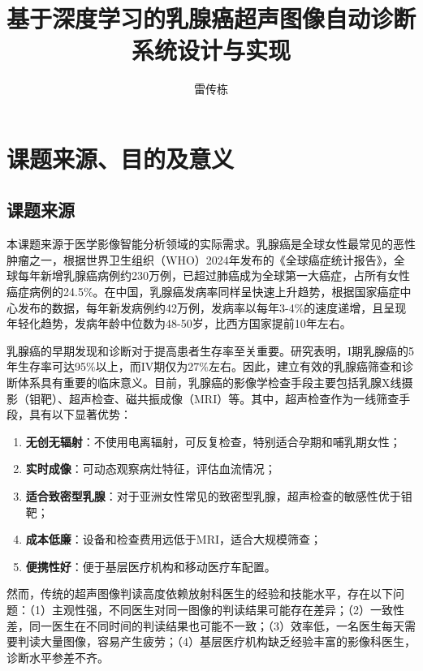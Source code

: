 \documentclass[supercite]{Hust-undergraduate-kaiti}
\title{基于深度学习的乳腺癌超声图像自动诊断系统设计与实现}
\author{雷传栋}
\theoremstyle{definition}
\begin{document}
\maketitle
\clearpage


\section{课题来源、目的及意义}

\subsection{课题来源}

本课题来源于医学影像智能分析领域的实际需求。乳腺癌是全球女性最常见的恶性肿瘤之一，根据世界卫生组织（WHO）2024年发布的《全球癌症统计报告》，全球每年新增乳腺癌病例约230万例，已超过肺癌成为全球第一大癌症，占所有女性癌症病例的24.5\%。在中国，乳腺癌发病率同样呈快速上升趋势，根据国家癌症中心发布的数据，每年新发病例约42万例，发病率以每年3-4\%的速度递增，且呈现年轻化趋势，发病年龄中位数为48-50岁，比西方国家提前10年左右。

乳腺癌的早期发现和诊断对于提高患者生存率至关重要。研究表明，I期乳腺癌的5年生存率可达95\%以上，而IV期仅为27\%左右。因此，建立有效的乳腺癌筛查和诊断体系具有重要的临床意义。目前，乳腺癌的影像学检查手段主要包括乳腺X线摄影（钼靶）、超声检查、磁共振成像（MRI）等。其中，超声检查作为一线筛查手段，具有以下显著优势：

\begin{enumerate}
    \item \textbf{无创无辐射}：不使用电离辐射，可反复检查，特别适合孕期和哺乳期女性；
    \item \textbf{实时成像}：可动态观察病灶特征，评估血流情况；
    \item \textbf{适合致密型乳腺}：对于亚洲女性常见的致密型乳腺，超声检查的敏感性优于钼靶；
    \item \textbf{成本低廉}：设备和检查费用远低于MRI，适合大规模筛查；
    \item \textbf{便携性好}：便于基层医疗机构和移动医疗车配置。
\end{enumerate}

然而，传统的超声图像判读高度依赖放射科医生的经验和技能水平，存在以下问题：（1）主观性强，不同医生对同一图像的判读结果可能存在差异；（2）一致性差，同一医生在不同时间的判读结果也可能不一致；（3）效率低，一名医生每天需要判读大量图像，容易产生疲劳；（4）基层医疗机构缺乏经验丰富的影像科医生，诊断水平参差不齐。
\end{document}
